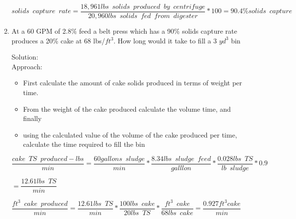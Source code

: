 \documentclass{article}
\begin{document}
\begin{enumerate}
$
	solids \enspace capture \enspace rate
	=
	\dfrac
	{
	18,961 lbs \enspace solids \enspace produced 		\enspace by \enspace centrifuge
	}
	{
	20,960 lbs \enspace solids \enspace fed 			\enspace from \enspace digester
	}
	*
	100 
	=\boxed
	{
	90.4\% solids \enspace capture
	}
$


\item At a 60 GPM of 2.8\% feed a belt press which has a 90\% solids capture rate produces a 20\% cake at 68 lbs/$ft^3$.  How long would it take to fill a 3 $yd^3$ bin  
	
	
Solution:\\
Approach:
\begin{itemize}
\item First calculate the amount of cake solids produced in terms of weight per time.
\item From the weight of the cake produced calculate the volume time, and finally
\item using the calculated value of the volume of the cake produced per time, calculate the time required to fill the bin\\
\end{itemize}

$\dfrac{cake \enspace TS \enspace produced - lbs}{min}= \dfrac {60 gallons \enspace sludge}{min}*\dfrac {8.34 lbs \enspace sludge \enspace feed}{galllon}*\dfrac{0.028 lbs \enspace TS}{lb \enspace sludge}*0.9$\\
\vspace{3mm}

$=\dfrac{12.61lbs \enspace TS}{min}$\\
\vspace{3mm}

$\dfrac{ft^3 \enspace cake \enspace produced}{min}=\dfrac{12.61lbs \enspace TS}{min}*\dfrac{100 lbs \enspace cake}{20lbs \enspace TS}*\dfrac{ft^3 \enspace cake}{68 lbs \enspace cake} = \dfrac{0.927ft^3 cake}{min}$\\
\vspace{3mm}


\end{enumerate}
\end{document}

